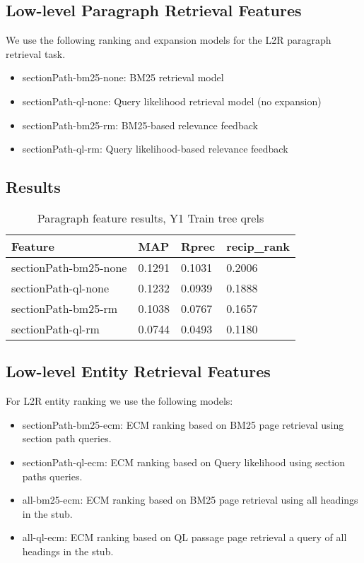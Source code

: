 \documentclass{article}
\begin{document}
\subsection{Low-level Paragraph Retrieval Features}\label{sec:para}

We  use the following ranking and expansion models for the L2R paragraph retrieval task.
\begin{itemize}
    \item sectionPath-bm25-none: BM25 retrieval model
    \item sectionPath-ql-none: Query likelihood retrieval model (no expansion)
    \item sectionPath-bm25-rm: BM25-based relevance feedback
    \item sectionPath-ql-rm: Query likelihood-based relevance feedback
\end{itemize}

\subsection{Results}

\begin{table}[tb]
\centering
\begin{tabular}{l l l l}
\hline
\textbf{Feature} & \textbf{MAP} & \textbf{Rprec} & \textbf{recip\_rank}\\
\hline
sectionPath-bm25-none & 0.1291 & 0.1031 & 0.2006 \\
sectionPath-ql-none & 0.1232 & 0.0939 & 0.1888 \\
sectionPath-bm25-rm & 0.1038 & 0.0767 & 0.1657 \\
sectionPath-ql-rm & 0.0744 & 0.0493 & 0.1180 \\
\hline
\end{tabular}
\caption{Paragraph feature results, Y1 Train tree qrels}\label{tab:para}
\end{table}

\subsection{Low-level Entity Retrieval Features}
\label{sec:entity}


For L2R entity ranking we use the following models:

\begin{itemize}
\item sectionPath-bm25-ecm: ECM ranking based on BM25 page retrieval using section path queries.
\item sectionPath-ql-ecm: ECM ranking based on Query likelihood using section paths queries.
\item all-bm25-ecm: ECM ranking based on BM25 page retrieval using all headings in the stub.
\item all-ql-ecm: ECM ranking based on QL passage page retrieval a query of all headings in the stub.

    \end{itemize}
\end{document}
